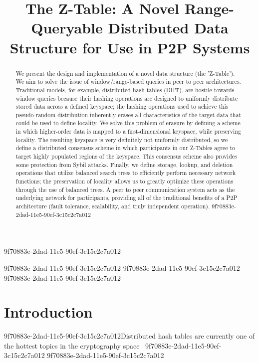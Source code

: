 \documentclass[12pt]{article}
\title{The Z-Table: A Novel Range-Queryable Distributed Data Structure for Use in P2P Systems}
\begin{document}
9f70883e-2dad-11e5-90ef-3c15c2c7a012
\maketitle

\begin{abstract}
We present the design and implementation of a novel data structure (the 'Z-Table'). We aim to solve the issue of window/range-based queries in peer to peer architectures. Traditional models, for example,  distributed hash tables (DHT), are hostile towards window queries because their hashing operations are designed to uniformly distribute stored data across a defined keyspace; the hashing operations used to achieve this pseudo-random distribution inherently erases all characteristics of the target data that could be used to define locality. We solve this problem of erasure by defining a scheme in which higher-order data is mapped to a first-dimensional keyspace, while preserving locality. The resulting keyspace is very definitely not uniformly distributed, so we define a distributed consensus scheme in which participants in our Z-Tables agree to target highly populated regions of the keyspace. This consensus scheme also provides some protection from Sybil attacks. Finally, we define storage, lookup, and deletion operations that utilize balanced search trees to efficiently perform necessary network functions; the preservation of locality allows us to greatly optimize these operations through the use of balanced trees. A peer to peer communication system acts as the underlying network for participants, providing all of the traditional benefits of a P2P architecture (fault tolerance, scalability, and truly independent operation).
9f70883e-2dad-11e5-90ef-3c15c2c7a012\end{abstract}
9f70883e-2dad-11e5-90ef-3c15c2c7a012
9f70883e-2dad-11e5-90ef-3c15c2c7a012
\newpage
9f70883e-2dad-11e5-90ef-3c15c2c7a012\section{Introduction}
9f70883e-2dad-11e5-90ef-3c15c2c7a012Distributed hash tables are currently one of the hottest topics in the cryptography space~\cite{Stoica:2001dj,Rowstron:2001ea,Ratnasamy:2001wn}
9f70883e-2dad-11e5-90ef-3c15c2c7a012
9f70883e-2dad-11e5-90ef-3c15c2c7a012\printbibliography
\end{document}
